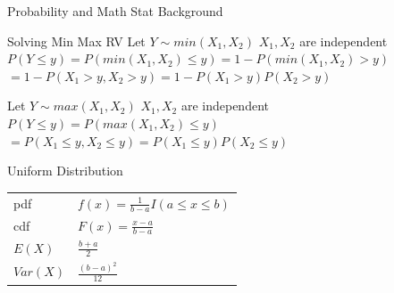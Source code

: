 \documentclass[a4paper,12pt,landscape]{article}
\begin{document}
\begin{multicols}{3}
\begin{section}{\small{Probability and Math Stat Background}}
	\begin{subsection}{Solving Min Max RV}
		Let $Y \sim min(X_1, X_2)$ $X_1, X_2$ are independent\\ 
		$P(Y \leq y) = P(min(X_1, X_2) \leq y) = 1 - P(min(X_1, X_2) > y)$ \\
		$= 1 - P(X_1 > y, X_2 > y) = 1 - P(X_1 > y)P(X_2 > y)$
		
		Let $Y \sim max(X_1, X_2)$ $X_1, X_2$ are independent\\ 
		$P(Y \leq y) = P(max(X_1, X_2) \leq y)$ \\
		$= P(X_1 \leq y, X_2 \leq y) = P(X_1 \leq y)P(X_2 \leq y)$
	\end{subsection}

	\begin{subsection}{Uniform Distribution}
		\begin{tabulary}{\linewidth}{l @{ : } L}
			pdf & $f(x) = \frac{1}{b-a}I(a\leq x \leq b)$ \\
			cdf & $F(x) = \frac{x-a}{b-a}$ \\
			$E(X)$ & $\frac{b+a}{2}$ \\
			$Var(X)$ & $\frac{(b-a)^2}{12}$
		\end{tabulary}
	\end{subsection}


\end{section}
\end{multicols}
\end{document}
